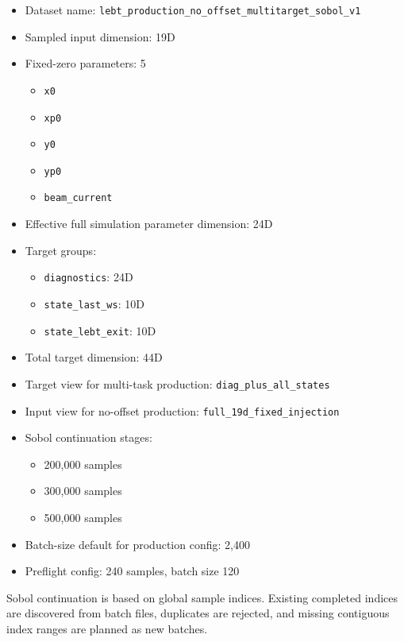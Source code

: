 \documentclass[
]{article}
\providecommand{\tightlist}{%
  \setlength{\itemsep}{0pt}\setlength{\parskip}{0pt}}
\begin{document}
\begin{itemize}
\tightlist
\item
  Dataset name:
  \texttt{lebt\_production\_no\_offset\_multitarget\_sobol\_v1}
\item
  Sampled input dimension: 19D
\item
  Fixed-zero parameters: 5

  \begin{itemize}
  \tightlist
  \item
    \texttt{x0}
  \item
    \texttt{xp0}
  \item
    \texttt{y0}
  \item
    \texttt{yp0}
  \item
    \texttt{beam\_current}
  \end{itemize}
\item
  Effective full simulation parameter dimension: 24D
\item
  Target groups:

  \begin{itemize}
  \tightlist
  \item
    \texttt{diagnostics}: 24D
  \item
    \texttt{state\_last\_ws}: 10D
  \item
    \texttt{state\_lebt\_exit}: 10D
  \end{itemize}
\item
  Total target dimension: 44D
\item
  Target view for multi-task production:
  \texttt{diag\_plus\_all\_states}
\item
  Input view for no-offset production:
  \texttt{full\_19d\_fixed\_injection}
\item
  Sobol continuation stages:

  \begin{itemize}
  \tightlist
  \item
    200,000 samples
  \item
    300,000 samples
  \item
    500,000 samples
  \end{itemize}
\item
  Batch-size default for production config: 2,400
\item
  Preflight config: 240 samples, batch size 120
\end{itemize}

Sobol continuation is based on global sample indices. Existing completed
indices are discovered from batch files, duplicates are rejected, and
missing contiguous index ranges are planned as new batches.
\end{document}
